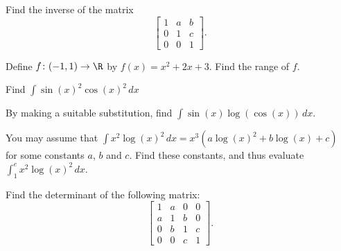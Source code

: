 \documentclass[12pt,twoside]{shefexam}
\newcommand{\xra}       {\rightarrow}
\renewcommand{\:}{\colon}
\begin{document}
 \question %
  Find the inverse of the matrix 
  \[ \left[\begin{array}{ccc}
      1 & a & b \\ 0 & 1 & c \\ 0 & 0 & 1 
     \end{array}\right].
  \]
 
\setcounter{enumi}{0}
\gdef\theenumi{\textbf{\sectionstyle{secnum}\arabic{enumi}}}%
\gdef\thequestion{\sectionstyle{secnum}\arabic{enumi}}%

 \question %
  Define $f\:(-1,1)\xra{}\R$ by $f(x)=x^2+2x+3$.  Find the range of $f$.

 \question %
  Find $\int\sin(x)^2\cos(x)^2\,dx$

 \question %
  By making a suitable substitution, find
  $\int\sin(x)\log(\cos(x))\,dx$.

 \question %
  You may assume that
  $\displaystyle \int x^2 \log(x)^2\,dx = x^3(a\log(x)^2 + b\log(x) + c)$\\
  for some constants $a$, $b$ and $c$.  Find these constants, and thus
  evaluate $\int_1^e x^2\log(x)^2\, dx$.

 \question %
  Find the determinant of the following matrix:
  \[ \left[\begin{array}{cccc}
      1 & a & 0 & 0 \\
      a & 1 & b & 0 \\
      0 & b & 1 & c \\
      0 & 0 & c & 1
     \end{array}\right].
  \]
\endpaper
\end{document}
